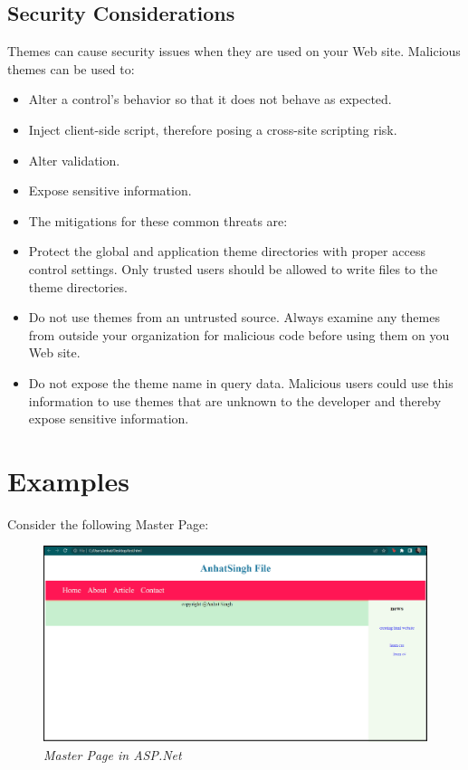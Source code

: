 \section{Security Considerations}
Themes can cause security issues when they are used on your Web site. Malicious themes can be used to:
\begin{itemize}
	\item Alter a control's behavior so that it does not behave as expected.	
	\item Inject client-side script, therefore posing a cross-site scripting risk.	
	\item Alter validation.	
	\item Expose sensitive information.	
	\item The mitigations for these common threats are:	
	\item Protect the global and application theme directories with proper access control settings. Only trusted users should be allowed to write files to the theme directories.	
	\item Do not use themes from an untrusted source. Always examine any themes from outside your organization for malicious code before using them on you Web site.	
	\item Do not expose the theme name in query data. Malicious users could use this information to use themes that are unknown to the developer and thereby expose sensitive information.
\end{itemize}


\chapter{Examples}

Consider the following Master Page: 
\begin{figure}[h]
	\centering
	\includegraphics[width=0.95\linewidth]{img/a3}
	\caption{\textit{Master Page in ASP.Net}}
	\label{fig:masterPage}
\end{figure}

